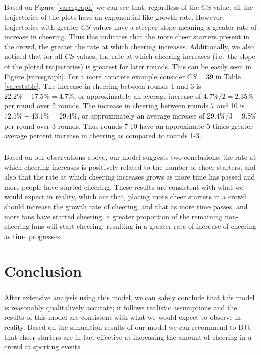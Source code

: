 \documentclass[oneside,12pt]{report}
\def\prefacesection#1{
\chapter*{#1}
\addcontentsline{toc}{chapter}{#1}
}
\begin{document}
\paragraph{}
Based on Figure \ref{varcsgraph} we can see that, regardless of the $CS$ value, all the trajectories of the plots have an exponential-like growth rate. However, trajectories with greater $CS$ values have a steeper slope meaning a greater rate of increase in cheering. Thus this indicates that the more cheer starters present in the crowd, the greater the rate at which cheering increases. Additionally, we also noticed that for all $CS$ values, the rate at which cheering increases (i.e.~the slope of the ploted trajectories) is greatest for later rounds. This can be easily seen in Figure \ref{varcsgraph}. For a more concrete example consider $CS=39$ in Table \ref{varcstable}. The increase in cheering between rounds 1 and 3 is $22.2\%-17.5\%=4.7\%$, or approximately an average increase of $4.7\%/2=2.35\%$ per round over 2 rounds. The increase in cheering between rounds 7 and 10 is $72.5\%-43.1\%=29.4\%$, or approximately an average increase of $29.4\%/3=9.8\%$ per round over 3 rounds. Thus rounds 7-10 have an approximate 5 times greater average percent increase in cheering as compared to rounds 1-3. 
\paragraph{}
Based on our observations above, our model suggests two conclusions: the rate at which cheering increases is positively related to the number of cheer starters, and also that the rate at which cheering increases grows as more time has passed and more people have started cheering. These results are consistent with what we would expect in reality, which are that, placing more cheer starters in a crowd should increase the growth rate of cheering, and that as more time passes, and more fans have started cheering, a greater proportion of the remaining non-cheering fans will start cheering, resulting in a greater rate of increase of cheering as time progresses.

\prefacesection{Conclusion}
\paragraph{}
After extensive analysis using this model, we can safely conclude that this model is reasonably qualitalively accurate; it follows realistic assumptions and the results of this model are consistent with what we would expect to observe in reality. Based on the simualtion results of our model we can recommend to BJU that cheer starters are in fact effective at increasing the amount of cheering in a crowd at sporting events. 
\end{document}

